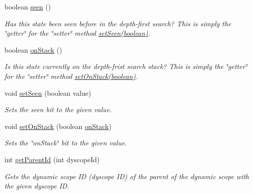 \begin{DoxyCompactItemize}
boolean \hyperlink{interfaceedu_1_1udel_1_1cis_1_1vsl_1_1civl_1_1state_1_1IF_1_1State_a6d1e8c23aebce43b60feb6d7d1b5125b}{seen} ()
\begin{DoxyCompactList}\small\item\em Has this state been seen before in the depth-\/first search? This is simply the \char`\"{}getter\char`\"{} for the \char`\"{}setter\char`\"{} method \hyperlink{interfaceedu_1_1udel_1_1cis_1_1vsl_1_1civl_1_1state_1_1IF_1_1State_a558ebb4507ac303283fc58a99cea40fc}{set\+Seen(boolean)}. \end{DoxyCompactList}\item 
boolean \hyperlink{interfaceedu_1_1udel_1_1cis_1_1vsl_1_1civl_1_1state_1_1IF_1_1State_a40a44e43817d3155cd89140fbd28693a}{on\+Stack} ()
\begin{DoxyCompactList}\small\item\em Is this state currently on the depth-\/frist search stack? This is simply the \char`\"{}getter\char`\"{} for the \char`\"{}setter\char`\"{} method \hyperlink{interfaceedu_1_1udel_1_1cis_1_1vsl_1_1civl_1_1state_1_1IF_1_1State_a1bfe417f4c4b97225837175914e34951}{set\+On\+Stack(boolean)}. \end{DoxyCompactList}\item 
void \hyperlink{interfaceedu_1_1udel_1_1cis_1_1vsl_1_1civl_1_1state_1_1IF_1_1State_a558ebb4507ac303283fc58a99cea40fc}{set\+Seen} (boolean value)
\begin{DoxyCompactList}\small\item\em Sets the seen bit to the given value. \end{DoxyCompactList}\item 
void \hyperlink{interfaceedu_1_1udel_1_1cis_1_1vsl_1_1civl_1_1state_1_1IF_1_1State_a1bfe417f4c4b97225837175914e34951}{set\+On\+Stack} (boolean \hyperlink{interfaceedu_1_1udel_1_1cis_1_1vsl_1_1civl_1_1state_1_1IF_1_1State_a40a44e43817d3155cd89140fbd28693a}{on\+Stack})
\begin{DoxyCompactList}\small\item\em Sets the \char`\"{}on\+Stack\char`\"{} bit to the given value. \end{DoxyCompactList}\item 
int \hyperlink{interfaceedu_1_1udel_1_1cis_1_1vsl_1_1civl_1_1state_1_1IF_1_1State_a1b4059c4fa8faf244103ff44107e49d4}{get\+Parent\+Id} (int dyscope\+Id)
\begin{DoxyCompactList}\small\item\em Gets the dynamic scope I\+D (dyscope I\+D) of the parent of the dynamic scope with the given dyscope I\+D. \end{DoxyCompactList}\item 

\end{DoxyCompactItemize}
